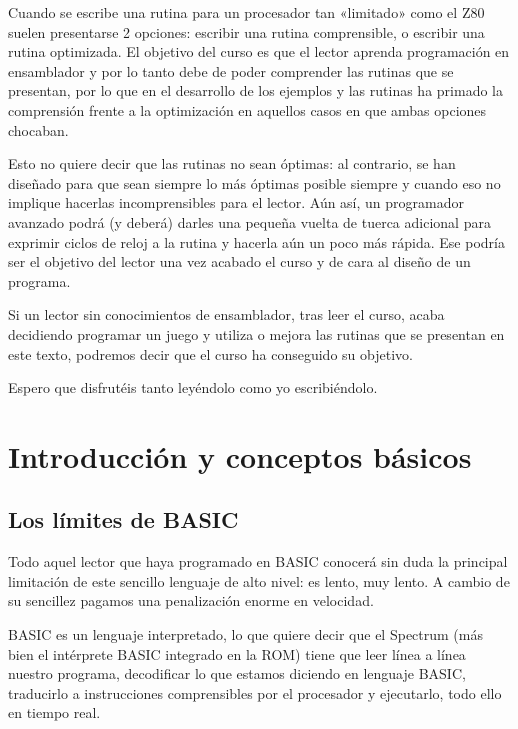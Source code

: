 \documentclass[letterpaper,10pt,spanish]{sphinxmanual}
\begin{document}
Cuando se escribe una rutina para un procesador tan «limitado» como el Z80 suelen presentarse 2 opciones: escribir una rutina comprensible, o escribir una rutina optimizada. El objetivo del curso es que el lector aprenda programación en ensamblador y por lo tanto debe de poder comprender las rutinas que se presentan, por lo que en el desarrollo de los ejemplos y las rutinas ha primado la comprensión frente a la optimización en aquellos casos en que ambas opciones chocaban.

Esto no quiere decir que las rutinas no sean óptimas: al contrario, se han diseñado para que sean siempre lo más óptimas posible siempre y cuando eso no implique hacerlas incomprensibles para el lector. Aún así, un programador avanzado podrá (y deberá) darles una pequeña vuelta de tuerca adicional para exprimir ciclos de reloj a la rutina y hacerla aún un poco más rápida. Ese podría ser el objetivo del lector una vez acabado el curso y de cara al diseño de un programa.

Si un lector sin conocimientos de ensamblador, tras leer el curso, acaba decidiendo programar un juego y utiliza o mejora las rutinas que se presentan en este texto, podremos decir que el curso ha conseguido su objetivo.

Espero que disfrutéis tanto leyéndolo como yo escribiéndolo.


\chapter{Introducción y conceptos básicos}
\label{\detokenize{02_introduccion/introduccion:introduccion-y-conceptos-basicos}}\label{\detokenize{02_introduccion/introduccion::doc}}

\section{Los límites de BASIC}
\label{\detokenize{02_introduccion/introduccion:los-limites-de-basic}}
Todo aquel lector que haya programado en BASIC conocerá sin duda la principal limitación de este sencillo lenguaje de alto nivel: es lento, muy lento. A cambio de su sencillez pagamos una penalización enorme en velocidad.

BASIC es un lenguaje interpretado, lo que quiere decir que el Spectrum (más bien el intérprete BASIC integrado en la ROM) tiene que leer línea a línea nuestro programa, decodificar lo que estamos diciendo en lenguaje BASIC, traducirlo a instrucciones comprensibles por el procesador y ejecutarlo, todo ello en tiempo real.
\end{document}
